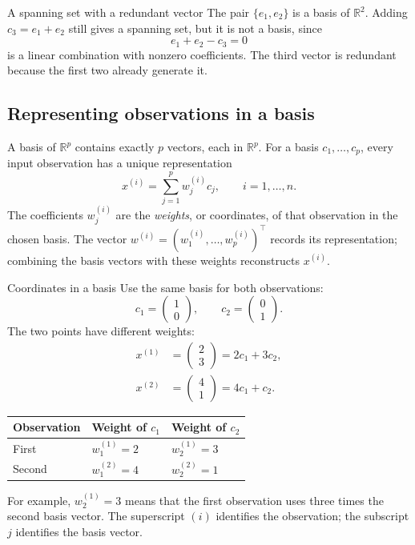 \documentclass[a4paper,12pt,oneside]{report}
\begin{document}
\begin{framedexample}{A spanning set with a redundant vector}
The pair $\{e_1,e_2\}$ is a basis of $\mathbb{R}^{2}$. Adding
$c_3=e_1+e_2$ still gives a spanning set, but it is not a basis, since
\[
  e_1+e_2-c_3=0
\]
is a linear combination with nonzero coefficients. The third vector
is redundant because the first two already generate it.
\end{framedexample}

\subsection{Representing observations in a basis}

A basis of $\mathbb{R}^{p}$ contains exactly $p$ vectors, each in
$\mathbb{R}^{p}$. For a basis $c_1,\ldots,c_p$, every input observation
has a unique representation
\[
  x^{(i)}=\sum_{j=1}^{p}w_j^{(i)}c_j,
  \qquad i=1,\ldots,n.
\]
The coefficients $w_j^{(i)}$ are the \emph{weights}, or coordinates,
of that observation in the chosen basis. The vector
$w^{(i)}=(w_1^{(i)},\ldots,w_p^{(i)})^\top$ records its representation;
combining the basis vectors with these weights reconstructs $x^{(i)}$.

\begin{framedexample}{Coordinates in a basis}
Use the same basis for both observations:
\[
  c_1=\begin{pmatrix}1\\0\end{pmatrix},\qquad
  c_2=\begin{pmatrix}0\\1\end{pmatrix}.
\]
The two points have different weights:
\[
\begin{aligned}
  x^{(1)}&=\begin{pmatrix}2\\3\end{pmatrix}=2c_1+3c_2,\\[4pt]
  x^{(2)}&=\begin{pmatrix}4\\1\end{pmatrix}=4c_1+c_2.
\end{aligned}
\]
\begin{center}
\begin{tabular}{@{}lll@{}}
\toprule
\textbf{Observation} & \textbf{Weight of $c_1$} & \textbf{Weight of $c_2$} \\
\midrule
First & $w_1^{(1)}=2$ & $w_2^{(1)}=3$ \\
Second & $w_1^{(2)}=4$ & $w_2^{(2)}=1$ \\
\bottomrule
\end{tabular}
\end{center}
For example, $w_2^{(1)}=3$ means that the first observation uses three
times the second basis vector. The superscript $(i)$ identifies the
observation; the subscript $j$ identifies the basis vector.
\end{framedexample}
\end{document}
